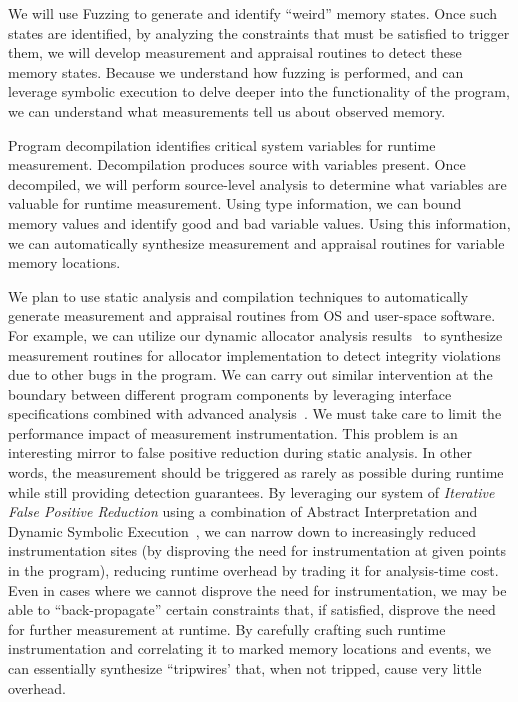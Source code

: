 \documentclass[runningheads]{llncs}
\begin{document}
We will use Fuzzing to generate and identify ``weird'' memory states.  Once such
states are identified, by analyzing the constraints that must be satisfied to
trigger them, we will develop measurement and appraisal routines to detect these
memory states.  Because we understand how fuzzing is performed, and can leverage
symbolic execution to delve deeper into the functionality of the program, we can
understand what measurements tell us about observed memory.

Program decompilation identifies critical system variables for runtime
measurement.  Decompilation produces source with variables present.  Once
decompiled, we will perform source-level analysis to determine what variables
are valuable for runtime measurement.  Using type information, we can bound
memory values and identify good and bad variable values.  Using this
information, we can automatically synthesize measurement and appraisal routines
for variable memory locations.

We plan to use static analysis and compilation techniques to automatically
generate measurement and appraisal routines from OS and user-space software.
For example, we can utilize our dynamic allocator analysis
results~\citep{eckert2018heaphopper} to synthesize measurement routines for
allocator implementation to detect integrity violations due to other bugs in the
program.  We can carry out similar intervention at the boundary between
different program components by leveraging interface specifications combined
with advanced analysis~\citep{dinh2021favocado}.  We must take care to limit the
performance impact of measurement instrumentation.  This problem is an
interesting mirror to false positive reduction during static analysis.  In other
words, the measurement should be triggered as rarely as possible during runtime
while still providing detection guarantees.  By leveraging our system of
\emph{Iterative False Positive Reduction} using a combination of Abstract
Interpretation and Dynamic Symbolic Execution~\citep{vadayath2022arbiter}, we
can narrow down to increasingly reduced instrumentation sites (by disproving the
need for instrumentation at given points in the program), reducing runtime
overhead by trading it for analysis-time cost.  Even in cases where we cannot
disprove the need for instrumentation, we may be able to ``back-propagate''
certain constraints that, if satisfied, disprove the need for further
measurement at runtime.  By carefully crafting such runtime instrumentation and
correlating it to marked memory locations and events, we can essentially
synthesize ``tripwires' that, when not tripped, cause very little overhead.
\end{document}
